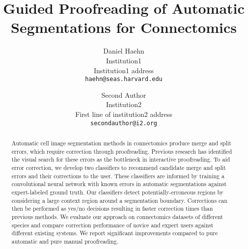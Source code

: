 \documentclass[10pt,twocolumn,letterpaper]{article}
\begin{document}
\title{Guided Proofreading of Automatic Segmentations for Connectomics}

\author{Daniel Haehn\\
Institution1\\
Institution1 address\\
{\tt\small haehn@seas.harvard.edu}
\and
Second Author\\
Institution2\\
First line of institution2 address\\
{\tt\small secondauthor@i2.org}
}

\maketitle

\begin{abstract}
Automatic cell image segmentation methods in connectomics produce merge and split errors, which require correction through proofreading. Previous research has identified the visual search for these errors as the bottleneck in interactive proofreading. To aid error correction, we develop two classifiers to recommend candidate merge and split errors and their corrections to the user. These classifiers are informed by training a convolutional neural network with known errors in automatic segmentations against expert-labeled ground truth. Our classifiers detect potentially-erroneous regions by considering a large context region around a segmentation boundary. Corrections can then be performed as yes/no decisions 
resulting in faster correction times than previous methods. We evaluate our approach on connectomics datasets of different species and compare correction performance of novice and expert users against different existing systems. We report significant improvements compared to pure automatic and pure manual proofreading.
\end{abstract}














{\small


}
\end{document}
